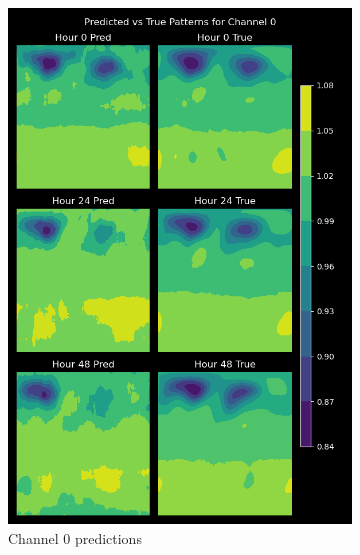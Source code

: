 \documentclass{article}
\begin{document}
\begin{figure}[ht]
    \centering
    \begin{subfigure}[b]{0.4\textwidth}
        \includegraphics[width=\textwidth]{../plots/autoregressive_predictions_channel0_20250321-061452.png}
        \caption{Channel 0 predictions}
    \end{subfigure}
    \begin{subfigure}[b]{0.4\textwidth}

\end{subfigure}
\end{figure}
\end{document}
